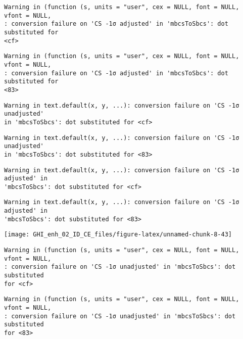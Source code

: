 \documentclass[
  10pt,
  a4paper,oneside]{article}
\begin{document}
\begin{verbatim}
Warning in (function (s, units = "user", cex = NULL, font = NULL, vfont = NULL,
: conversion failure on 'CS -1σ adjusted' in 'mbcsToSbcs': dot substituted for
<cf>
\end{verbatim}

\begin{verbatim}
Warning in (function (s, units = "user", cex = NULL, font = NULL, vfont = NULL,
: conversion failure on 'CS -1σ adjusted' in 'mbcsToSbcs': dot substituted for
<83>
\end{verbatim}

\begin{verbatim}
Warning in text.default(x, y, ...): conversion failure on 'CS -1σ unadjusted'
in 'mbcsToSbcs': dot substituted for <cf>
\end{verbatim}

\begin{verbatim}
Warning in text.default(x, y, ...): conversion failure on 'CS -1σ unadjusted'
in 'mbcsToSbcs': dot substituted for <83>
\end{verbatim}

\begin{verbatim}
Warning in text.default(x, y, ...): conversion failure on 'CS -1σ adjusted' in
'mbcsToSbcs': dot substituted for <cf>
\end{verbatim}

\begin{verbatim}
Warning in text.default(x, y, ...): conversion failure on 'CS -1σ adjusted' in
'mbcsToSbcs': dot substituted for <83>
\end{verbatim}

\begin{center}\texttt{[image: GHI\_enh\_02\_ID\_CE\_files/figure-latex/unnamed-chunk-8-43]} \end{center}

\begin{verbatim}
Warning in (function (s, units = "user", cex = NULL, font = NULL, vfont = NULL,
: conversion failure on 'CS -1σ unadjusted' in 'mbcsToSbcs': dot substituted
for <cf>
\end{verbatim}

\begin{verbatim}
Warning in (function (s, units = "user", cex = NULL, font = NULL, vfont = NULL,
: conversion failure on 'CS -1σ unadjusted' in 'mbcsToSbcs': dot substituted
for <83>
\end{verbatim}
\end{document}
